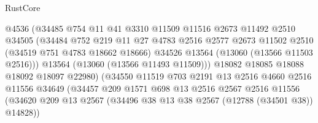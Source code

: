 \begin{lexlean}{RustCore}
\begin{coremodule}
                                  @4536
                                  (@34485
                                    @754
                                    @11
                                    @41
                                    @3310
                                    @11509
                                    @11516
                                    @2673
                                    @11492
                                    @2510
                                    @34505
                                    (@34484
                                      @752
                                      @219
                                      @11
                                      @27
                                      @4783
                                      @2516
                                      @2577
                                      @2673
                                      @11502
                                      @2510
                                      (@34519 @751 @4783 @18662 @18666)
                                      @34526
                                      @13564
                                      (@13060 (@13566 @11503 @2516)))
                                    @13564
                                    (@13060 (@13566 @11493 @11509)))
                                  @18082
                                  @18085
                                  @18088
                                  @18092
                                  @18097
                                  @22980)
                                (@34550
                                  @11519
                                  @703
                                  @2191
                                  @13
                                  @2516
                                  @4660
                                  @2516
                                  @11556
                                  @34649
                                  (@34457
                                    @209
                                    @1571
                                    @698
                                    @13
                                    @2516
                                    @2567
                                    @2516
                                    @11556
                                    (@34620
                                      @209
                                      @13
                                      @2567
                                      (@34496 @38 @13 @38 @2567 (@12788 (@34501 @38)) @14828))

\end{coremodule}
\end{lexlean}
